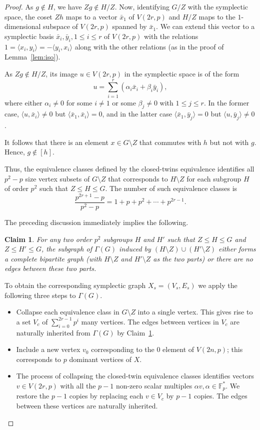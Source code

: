 \documentclass{elsarticle}
\newtheorem{claim}[theorem]{Claim}
\newcommand{\F}{\mathbb{F}}
\newcommand{\sympl}[1]{\langle #1 \rangle}
\begin{document}
\begin{proof}
As $g\notin H$, we have $Zg\notin H/Z$. Now, identifying $G/Z$ with
the symplectic space, the coset $Zh$ maps to a vector $\bar{x}_1$ of
$V(2r,p)$ and $H/Z$ maps to the $1$-dimensional subspace of $V(2r,p)$
spanned by $\bar{x}_1$. We can extend this vector to a symplectic
basis $\bar{x}_i, \bar{y}_i, 1\le i\le r$ of $V(2r,p)$ with the
relations $1=\sympl{x_i,y_i}=-\sympl{y_i,x_i}$ along with the other
relations (as in the proof of Lemma~\ref{lem:iso}).

As $Zg\not\in H/Z$, its image $u\in V(2r,p)$ in the symplectic space
is of the form
\[
  u = \sum_{i=1}^r (\alpha_i\bar{x}_i + \beta_i \bar{y}_i),
\]
where either $\alpha_i\ne 0$ for some $i\ne 1$ or some $\beta_j\ne 0$
with $1\le j\le r$.  In the former case, $\sympl{u,\bar{x}_i}\ne 0$ but
$\sympl{\bar{x}_1,\bar{x}_i}=0$, and in the latter case
$\sympl{\bar{x}_1,\bar{y}_j}=0$ but $\sympl{u,\bar{y}_j}\ne 0$.

It follows that there is an element $x\in G\setminus Z$ that commutes
with $h$ but not with $g$. Hence, $g\notin [h]$.

Thus, the equivalence classes defined by the closed-twins equivalence
identifies all $p^2-p$ size vertex subsets of $G\setminus Z$ that
corresponds to $H\setminus Z$ for each subgroup $H$ of order $p^2$
such that $Z\le H\le G$. The number of such equivalence classes is
\[
\frac{p^{2r+1}-p}{p^2-p} = 1 + p + p^2 +\cdots + p^{2r-1}.
\]

The preceding discussion immediately implies the following.

\begin{claim}\label{cl:bip} For any two order $p^2$ subgroups $H$
  and $H'$ such that $Z\le H\le G$ and $Z\le H'\le G$, the subgraph of
  $\Gamma(G)$ induced by $(H\setminus Z)\cup (H'\setminus Z)$ either
  forms a complete bipartite graph (with $H\setminus Z$ and
  $H'\setminus Z$ as the two parts) or there are no edges between
  these two parts.
\end{claim}

To obtain the corresponding symplectic graph $X_s=(V_s,E_s)$ we
apply the following three steps to $\Gamma(G)$.

\begin{itemize}
\item[(a)] Collapse each equivalence class in $G\setminus Z$ into a
  single vertex. This gives rise to a set $V_c$ of
  $\sum_{i=0}^{2r-1}p^i$ many vertices. The edges between vertices
  in $V_c$ are naturally inherited from $\Gamma(G)$ by Claim~\ref{cl:bip}.
\item[(b)] Include a new vertex $v_0$ corresponding to the $0$ element
  of $V(2n,p)$; this corresponds to $p$ dominant vertices of $X$.
\item[(c)] The process of collapsing the closed-twin equivalence
  classes identifies vectors $v\in V(2r,p)$ with all the $p-1$ non-zero
  scalar multiples $\alpha v, \alpha\in\F^*_p$. We restore the $p-1$
  copies by replacing each $v\in V_c$ by $p-1$ copies. The edges
  between these vertices are naturally inherited.
\end{itemize}


\end{proof}
\end{document}

